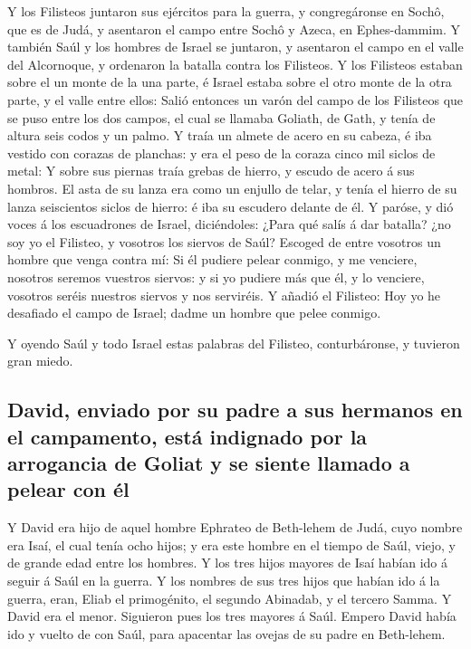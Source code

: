  Y los Filisteos juntaron sus ejércitos para la guerra, y
congregáronse en Sochô, que es de Judá, y asentaron el campo entre Sochô
y Azeca, en Ephes-dammim.  Y también Saúl y los hombres de
Israel se juntaron, y asentaron el campo en el valle del Alcornoque, y
ordenaron la batalla contra los Filisteos.  Y los
Filisteos estaban sobre el un monte de la una parte, é Israel estaba
sobre el otro monte de la otra parte, y el valle entre ellos:
 Salió entonces un varón del campo de los Filisteos que se
puso entre los dos campos, el cual se llamaba Goliath, de Gath, y tenía
de altura seis codos y un palmo.  Y traía un almete de
acero en su cabeza, é iba vestido con corazas de planchas: y era el peso
de la coraza cinco mil siclos de metal:  Y sobre sus
piernas traía grebas de hierro, y escudo de acero á sus hombros.
 El asta de su lanza era como un enjullo de telar, y tenía
el hierro de su lanza seiscientos siclos de hierro: é iba su escudero
delante de él.  Y paróse, y dió voces á los escuadrones de
Israel, diciéndoles: ¿Para qué salís á dar batalla? ¿no soy yo el
Filisteo, y vosotros los siervos de Saúl? Escoged de entre vosotros un
hombre que venga contra mí:  Si él pudiere pelear conmigo,
y me venciere, nosotros seremos vuestros siervos: y si yo pudiere más
que él, y lo venciere, vosotros seréis nuestros siervos y nos serviréis.
 Y añadió el Filisteo: Hoy yo he desafiado el campo de
Israel; dadme un hombre que pelee conmigo.

 Y oyendo Saúl y todo Israel estas palabras del Filisteo,
conturbáronse, y tuvieron gran miedo.

\hypertarget{david-enviado-por-su-padre-a-sus-hermanos-en-el-campamento-estuxe1-indignado-por-la-arrogancia-de-goliat-y-se-siente-llamado-a-pelear-con-uxe9l}{%
\subsection{David, enviado por su padre a sus hermanos en el campamento,
está indignado por la arrogancia de Goliat y se siente llamado a pelear
con
él}\label{david-enviado-por-su-padre-a-sus-hermanos-en-el-campamento-estuxe1-indignado-por-la-arrogancia-de-goliat-y-se-siente-llamado-a-pelear-con-uxe9l}}

 Y David era hijo de aquel hombre Ephrateo de Beth-lehem
de Judá, cuyo nombre era Isaí, el cual tenía ocho hijos; y era este
hombre en el tiempo de Saúl, viejo, y de grande edad entre los hombres.
 Y los tres hijos mayores de Isaí habían ido á seguir á
Saúl en la guerra. Y los nombres de sus tres hijos que habían ido á la
guerra, eran, Eliab el primogénito, el segundo Abinadab, y el tercero
Samma.  Y David era el menor. Siguieron pues los tres
mayores á Saúl.  Empero David había ido y vuelto de con
Saúl, para apacentar las ovejas de su padre en Beth-lehem.

